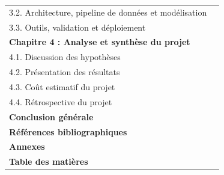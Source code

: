 \begin{longtable}{@{}p{\dimexpr\textwidth-1.6cm\relax}@{}r@{}}
\hspace{1em}3.2. Architecture, pipeline de données et modélisation & \pageref{sec:3-3}\\
\hspace{1em}3.3. Outils, validation et déploiement & \pageref{sec:3-4}\\[0.5em]
\textbf{Chapitre 4 : Analyse et synthèse du projet} & \pageref{chap:quatre}\\
\hspace{1em}4.1. Discussion des hypothèses & \pageref{sec:4-1}\\
\hspace{1em}4.2. Présentation des résultats & \pageref{sec:4-2}\\
\hspace{1em}4.3. Coût estimatif du projet & \pageref{sec:4-3}\\
\hspace{1em}4.4. Rétrospective du projet & \pageref{sec:4-4}\\[0.5em]
\textbf{Conclusion générale} & \pageref{sec:conclusion}\\
\textbf{Références bibliographiques} & \pageref{sec:biblio}\\
\textbf{Annexes} & \pageref{sec:annexes}\\
\textbf{Table des matières} & \pageref{sec:tdm}\\
\end{longtable}
\onehalfspacing
\clearpage
